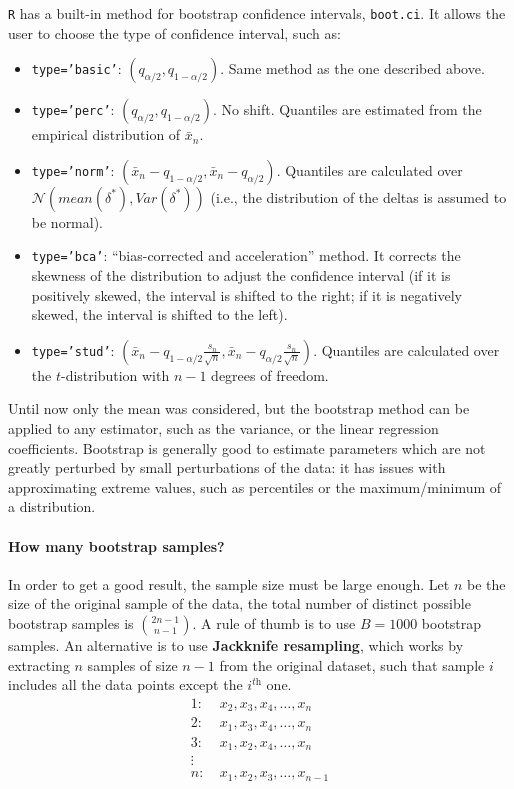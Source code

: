 \texttt{R} has a built-in method for bootstrap confidence intervals, \texttt{boot.ci}. It allows the user to choose the type of confidence interval, such as:
\begin{itemize}
    \item \texttt{type='basic'}: $(q_{{\alpha}/2}, q_{1-\alpha/2})$. Same method as the one described above.
    \item \texttt{type='perc'}: $(q_{\alpha/2}, q_{1 - \alpha/2})$. No shift. Quantiles are estimated from the empirical distribution of $\bar{x}_n$.
    \item \texttt{type='norm'}: $(\bar{x}_n - q_{1-\alpha/2}, \bar{x}_n - q_{\alpha/2})$. Quantiles are calculated over $\mathcal{N}(\textit{mean}(\delta^*), \textit{Var}(\delta^*))$ (i.e., the distribution of the deltas is assumed to be normal).
    \item \texttt{type='bca'}: ``bias-corrected and acceleration'' method. It corrects the skewness of the distribution to adjust the confidence interval (if it is positively skewed, the interval is shifted to the right; if it is negatively skewed, the interval is shifted to the left).
    \item \texttt{type='stud'}: $(\bar{x}_n - q_{1-\alpha/2}\frac{s_n}{\sqrt{n}}, \bar{x}_n - q_{\alpha/2}\frac{s_n}{\sqrt{n}})$. Quantiles are calculated over the $t$-distribution with $n-1$ degrees of freedom.
\end{itemize}
Until now only the mean was considered, but the bootstrap method can be applied to any estimator, such as the variance, or the linear regression coefficients. Bootstrap is generally good to estimate parameters which are not greatly perturbed by small perturbations of the data: it has issues with approximating extreme values, such as percentiles or the maximum/minimum of a distribution.

\paragraph{How many bootstrap samples?} In order to get a good result, the sample size must be large enough. Let $n$ be the size of the original sample of the data, the total number of distinct possible bootstrap samples is $\binom{2n-1}{n-1}$. A rule of thumb is to use $B = 1000$ bootstrap samples. An alternative is to use \textbf{Jackknife resampling}, which works by extracting $n$ samples of size $n-1$ from the original dataset, such that sample $i$ includes all the data points except the $i^{\textit{th}}$ one.
\begin{align*}
    1:& \ x_2, x_3, x_4, \ldots, x_n \\
    2:& \ x_1, x_3, x_4, \ldots, x_n \\
    3:& \ x_1, x_2, x_4, \ldots, x_n \\
    \vdots \\
    n:& \ x_1, x_2, x_3, \ldots, x_{n-1}
\end{align*}

